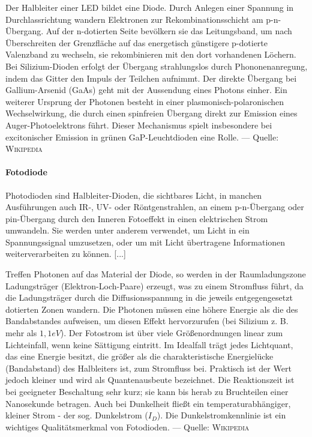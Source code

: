 Der Halbleiter einer LED bildet eine Diode. Durch Anlegen einer Spannung in Durchlassrichtung wandern Elektronen zur Rekombinationsschicht am p-n-Übergang. Auf der n-dotierten Seite bevölkern sie das Leitungsband, um nach Überschreiten der Grenzfläche auf das energetisch günstigere p-dotierte Valenzband zu wechseln, sie rekombinieren mit den dort vorhandenen Löchern. Bei Silizium-Dioden erfolgt der Übergang strahlungslos durch Phononenanregung, indem das Gitter den Impuls der Teilchen aufnimmt. Der direkte Übergang bei Gallium-Arsenid (GaAs) geht mit der Aussendung eines Photons einher. Ein weiterer Ursprung der Photonen besteht in einer plasmonisch-polaronischen Wechselwirkung, die durch einen spinfreien Übergang direkt zur Emission eines Auger-Photoelektrons führt. Dieser Mechanismus spielt insbesondere bei excitonischer Emission in grünen GaP-Leuchtdioden eine Rolle.  --- Quelle: \textsc{Wikipedia}




\paragraph{Fotodiode}

Photodioden sind Halbleiter-Dioden, die sichtbares Licht, in manchen Ausführungen auch IR-, UV- oder Röntgenstrahlen, an einem p-n-Übergang oder pin-Übergang durch den Inneren Fotoeffekt in einen elektrischen Strom umwandeln. Sie werden unter anderem verwendet, um Licht in ein Spannungssignal umzusetzen, oder um mit Licht übertragene Informationen weiterverarbeiten zu können. [...]

Treffen Photonen auf das Material der Diode, so werden in der Raumladungszone Ladungsträger (Elektron-Loch-Paare) erzeugt, was zu einem Stromfluss führt, da die Ladungsträger durch die Diffusionsspannung in die jeweils entgegengesetzt dotierten Zonen wandern. Die Photonen müssen eine höhere Energie als die des Bandabstandes aufweisen, um diesen Effekt hervorzurufen (bei Silizium z. B. mehr als \(1,1 eV\)). Der Fotostrom ist über viele Größenordnungen linear zum Lichteinfall, wenn keine Sättigung eintritt. Im Idealfall trägt jedes Lichtquant, das eine Energie besitzt, die größer als die charakteristische Energielücke (Bandabstand) des Halbleiters ist, zum Stromfluss bei. Praktisch ist der Wert jedoch kleiner und wird als Quantenausbeute bezeichnet. Die Reaktionszeit ist bei geeigneter Beschaltung sehr kurz; sie kann bis herab zu Bruchteilen einer Nanosekunde betragen.
Auch bei Dunkelheit fließt ein temperaturabhängiger, kleiner Strom - der sog. Dunkelstrom (\(I_D\)). Die Dunkelstromkennlinie ist ein wichtiges Qualitätsmerkmal von Fotodioden.  --- Quelle: \textsc{Wikipedia}



